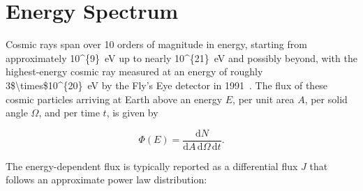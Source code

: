 







\section{Energy Spectrum}\label{sec:spectrum}
Cosmic rays span over 10 orders of magnitude in energy, starting from approximately \qty[parse-numbers=false]{10^{9}}{\electronvolt} up to nearly \qty[parse-numbers=false]{10^{21}}{\electronvolt} and possibly beyond, with the highest-energy cosmic ray measured at an energy of roughly \qty[parse-numbers=false]{3$\times$10^{20}}{\electronvolt} by the Fly's Eye detector in 1991~\cite{flyseye_prl1995_omg}.
The flux of these cosmic particles arriving at Earth above an energy $E$, per unit area $A$, per solid angle $\Omega$, and per time $t$, is given by

\begin{equation}
    \Phi(E) = \frac{\text{d}N}{\text{d}A\,\text{d}\Omega\,\text{d}t}. \label{eq:flux}
\end{equation}

\noindent
The energy-dependent flux is typically reported as a differential flux $J$ that follows an approximate power law distribution:

